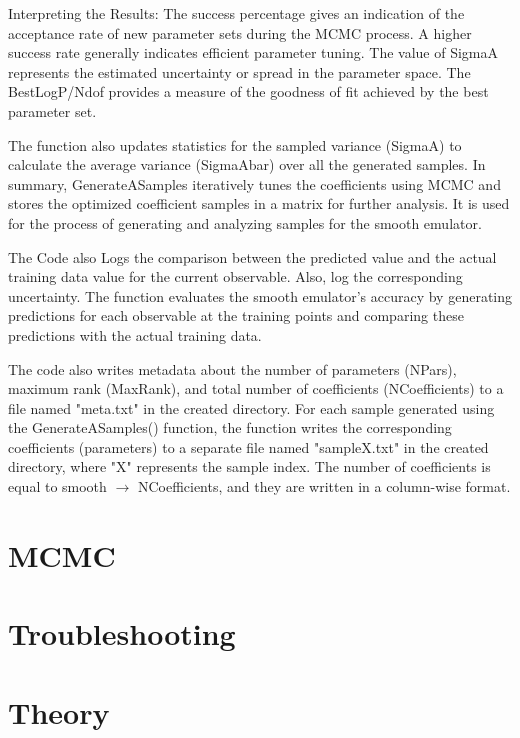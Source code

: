 \documentclass[12pt]{article}
\numberwithin{equation}{section}
\numberwithin{figure}{section}
\begin{document}
Interpreting the Results:
The success percentage gives an indication of the acceptance rate of new parameter sets during the MCMC process. A higher success rate generally indicates efficient parameter tuning. The value of SigmaA represents the estimated uncertainty or spread in the parameter space. The BestLogP/Ndof provides a measure of the goodness of fit achieved by the best parameter set. 


The function also updates statistics for the sampled variance (SigmaA) to calculate the average variance (SigmaAbar) over all the generated samples. In summary, GenerateASamples iteratively tunes the coefficients using MCMC and stores the optimized coefficient samples in a matrix for further analysis. It is used for the process of generating and analyzing samples for the smooth emulator.

The Code also Logs the comparison between the predicted value and the actual training data value for the current observable. Also, log the corresponding uncertainty. The function evaluates the smooth emulator's accuracy by generating predictions for each observable at the training points and comparing these predictions with the actual training data.  


The code also writes metadata about the number of parameters (NPars), maximum rank (MaxRank), and total number of coefficients (NCoefficients) to a file named "meta.txt" in the created directory. For each sample generated using the GenerateASamples() function, the function writes the corresponding coefficients (parameters) to a separate file named "sampleX.txt" in the created directory, where "X" represents the sample index. The number of coefficients is equal to smooth $\rightarrow$ NCoefficients, and they are written in a column-wise format. 


\section{MCMC}


\section{Troubleshooting}


\section{Theory}
\end{document}
